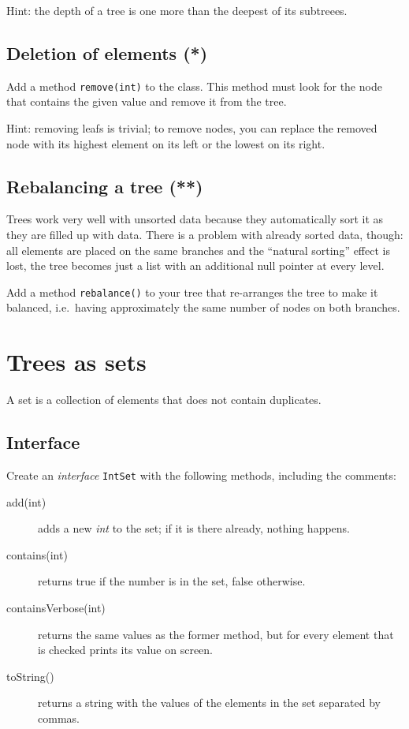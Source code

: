 \documentclass{article}
\begin{document}
Hint: the depth of a tree is one more than the deepest of its
subtreees. 

\subsection{Deletion of elements (*)}
\label{sec:deletion-elements}

Add a method \verb+remove(int)+ to the class. This method must look
for the node that contains the given value and remove it from the
tree. 

Hint: removing leafs is trivial; to remove nodes, you can replace the
removed node with its highest element on its left or the lowest on its
right. 

\subsection{Rebalancing a tree (**)}
\label{sec:rebalancing-tree-}

Trees work very well with unsorted data because they automatically
sort it as they are filled up with data. There is a problem with
already sorted data, though: all elements are placed on the same
branches and the ``natural sorting'' effect is lost, the tree becomes
just a list with an additional null pointer at every level. 

Add a method \verb+rebalance()+ to your tree that re-arranges the tree
to make it balanced, i.e.~having approximately the same number of
nodes on both branches. 


\section{Trees as sets}
\label{sec:trees-as-sets}

A set is a collection of elements that does not contain duplicates. 

\subsection{Interface}
\label{sec:interface1}

Create an \emph{interface} \verb+IntSet+ with the following methods,
including the comments: 

\begin{description}
\item[add(int)] adds a new \emph{int} to the set; if it is there
  already, nothing happens.
\item[contains(int)] returns true if the number is in the set, false
  otherwise.
\item[containsVerbose(int)] returns the same values as the former
  method, but for every element that is checked prints its value on
  screen.
\item[toString()] returns a string with the values of the elements in
  the set separated by commas.
\end{description}
\end{document}
